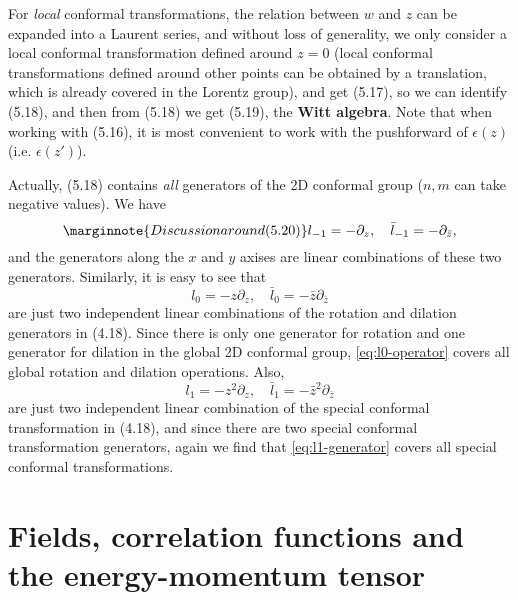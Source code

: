 \documentclass[hyperref, a4paper]{article}
\newcommand*{\concept}[1]{{\textbf{#1}}}
\begin{document}
For \emph{local} conformal transformations, the relation between $w$ and $z$ can be expanded into a Laurent 
series, and without loss of generality, we only consider a local conformal transformation defined around 
$z=0$ (local conformal transformations defined around other points can be obtained by a translation, which is 
already covered in the Lorentz group), and get (5.17), so we can identify (5.18), and then from (5.18) 
we get (5.19), the \concept{Witt algebra}.  
Note that when working with (5.16), it is most convenient to work with the pushforward of $\epsilon(z)$ (i.e. $\epsilon(z')$). 

Actually, (5.18) contains \emph{all} generators of the 2D conformal group ($n, m$ can take negative values). 
We have 
\begin{equation} \marginnote{Discussion around (5.20)}
    l_{-1} = - \partial_z, \quad \bar{l}_{-1} = - \partial_{\bar{z}},
\end{equation}
and the generators along the $x$ and $y$ axises are linear combinations of these two generators.
Similarly, it is easy to see that 
\begin{equation}
    l_0 = - z \partial_z, \quad \bar{l}_0 = - \bar{z} \partial_{\bar{z}}
    \label{eq:l0-operator}
\end{equation}
are just two independent linear combinations of the rotation and dilation generators in (4.18).
Since there is only one generator for rotation and one generator for dilation in the global 2D conformal group, 
\eqref{eq:l0-operator} covers all global rotation and dilation operations.
Also,  
\begin{equation}
    l_1 = - z^2 \partial_z , \quad \bar{l}_1 = - \bar{z}^2 \partial_{\bar{z}}
    \label{eq:l1-generator}
\end{equation}
are just two independent linear combination of the special conformal transformation in (4.18), and since there 
are two special conformal transformation generators, again we find that \eqref{eq:l1-generator} covers all 
special conformal transformations. 

\section{Fields, correlation functions and the energy-momentum tensor}
\end{document}
